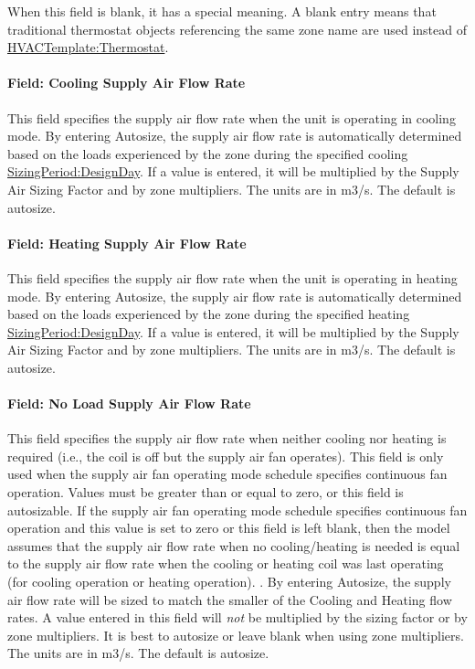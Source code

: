 When this field is blank, it has a special meaning. A blank entry means that traditional thermostat objects referencing the same zone name are used instead of \hyperref[hvactemplatethermostat]{HVACTemplate:Thermostat}.

\paragraph{Field: Cooling Supply Air Flow Rate}\label{field-cooling-supply-air-flow-rate-2}

This field specifies the supply air flow rate when the unit is operating in cooling mode. By entering Autosize, the supply air flow rate is automatically determined based on the loads experienced by the zone during the specified cooling \hyperref[sizingperioddesignday]{SizingPeriod:DesignDay}. If a value is entered, it will be multiplied by the Supply Air Sizing Factor and by zone multipliers. The units are in m3/s. The default is autosize.

\paragraph{Field: Heating Supply Air Flow Rate}\label{field-heating-supply-air-flow-rate-2}

This field specifies the supply air flow rate when the unit is operating in heating mode. By entering Autosize, the supply air flow rate is automatically determined based on the loads experienced by the zone during the specified heating \hyperref[sizingperioddesignday]{SizingPeriod:DesignDay}. If a value is entered, it will be multiplied by the Supply Air Sizing Factor and by zone multipliers. The units are in m3/s. The default is autosize.

\paragraph{Field: No Load Supply Air Flow Rate}\label{field-no-load-supply-air-flow-rate-2}

This field specifies the supply air flow rate when neither cooling nor heating is required (i.e., the coil is off but the supply air fan operates). This field is only used when the supply air fan operating mode schedule specifies continuous fan operation. Values must be greater than or equal to zero, or this field is autosizable. If the supply air fan operating mode schedule specifies continuous fan operation and this value is set to zero or this field is left blank, then the model assumes that the supply air flow rate when no cooling/heating is needed is equal to the supply air flow rate when the cooling or heating coil was last operating (for cooling operation or heating operation). . By entering Autosize, the supply air flow rate will be sized to match the smaller of the Cooling and Heating flow rates. A value entered in this field will \emph{not} be multiplied by the sizing factor or by zone multipliers. It is best to autosize or leave blank when using zone multipliers. The units are in m3/s. The default is autosize.

